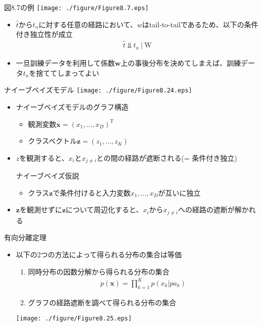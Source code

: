 \begin{frame}{図8.7の例}
 \texttt{[image: ./figure/Figure8.7.eps]}
 \begin{itemize}
  \item $\hat{t}$から$t_n$に対する任意の経路において、$w$はtail-to-tailであるため、以下の条件付き独立性が成立
        \begin{eqnarray*}
         \hat{t} \Perp t_n \ | \ \mathrm{W}
        \end{eqnarray*}
  \item 一旦訓練データを利用して係数$\bm{w}$上の事後分布を決めてしまえば、訓練データ$t_n$を捨ててしまってよい
 \end{itemize}
\end{frame}

\begin{frame}{ナイーブベイズモデル}
 \texttt{[image: ./figure/Figure8.24.eps]}
 \begin{itemize}
  \item ナイーブベイズモデルのグラフ構造
        \begin{itemize}
         \item 観測変数$\bm{x}=(x_1,...,x_D)^{\mathrm{T}}$
         \item クラスベクトル$\bm{z}=(z_1,...,z_K)$
        \end{itemize}
  \item $z$を観測すると、$x_i$と$x_{j \neq i}$との間の経路が遮断される(= 条件付き独立)
        \begin{block}{ナイーブベイズ仮説}
         \begin{itemize}
          \item クラス$\bm{z}$で条件付けると入力変数$x_1,...,x_D$が互いに独立
         \end{itemize}
        \end{block}
  \item $\bm{z}$を観測せずに$\bm{z}$について周辺化すると、$x_i$から$x_{j \neq i}$への経路の遮断が解かれる
 \end{itemize}
\end{frame}

\begin{frame}{有向分離定理}
 \begin{itemize}
  \item 以下の2つの方法によって得られる分布の集合は等価
        \begin{enumerate}
         \item 同時分布の因数分解から得られる分布の集合
               \begin{eqnarray*}
                p(\bm{x}) = \prod_{k=1}^Kp(x_k|pa_k)
               \end{eqnarray*}
         \item グラフの経路遮断を調べて得られる分布の集合
        \end{enumerate}
        \begin{center}
         \texttt{[image: ./figure/Figure8.25.eps]}
        \end{center} 
 \end{itemize}
\end{frame}

